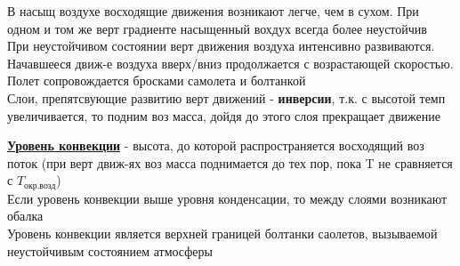 В насыщ воздухе восходящие движения возникают легче, чем в сухом. При одном и том же верт градиенте насыщенный вохдух всегда более неустойчив\\
При неустойчивом состоянии верт движения воздуха интенсивно развиваются. Начавшееся движ-е воздуха вверх/вниз продолжается с возрастающей скоростью.  Полет сопровождается бросками самолета и болтанкой\\
Слои, препятсвующие развитию верт движений - \textbf{инверсии}, т.к. с высотой темп увеличивается, то подним воз масса, дойдя до этого слоя прекращает движение\\
\par \underline{\textbf{Уровень конвекции}} - высота, до которой распространяется восходящий воз поток (при верт движ-ях воз масса поднимается до тех пор, пока T не сравняется с $T_\text{окр.возд}$)\\
Если уровень конвекции выше уровня конденсации, то между слоями возникают обалка\\
Уровень конвекции является верхней границей болтанки саолетов, вызываемой неустойчивым состоянием атмосферы




 
